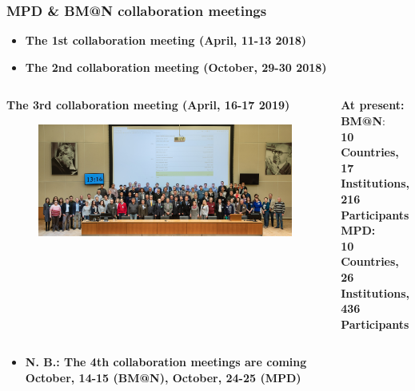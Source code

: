 \documentclass[dvipsnames] {beamer}
\begin{document}
\begin{frame}
  \frametitle{\bf \centering \footnotesize MPD \& BM@N collaboration meetings}
  
  \begin{block}{}
    \begin{itemize}
    \item \bf \centering \scriptsize The 1st collaboration meeting {\color{red} (April, 11-13 2018)}
    \item \bf \centering \scriptsize The 2nd collaboration meeting {\color{red} (October, 29-30 2018)}
    \end{itemize}
   \end{block}
  \begin{columns}[c]   
     \begin{block}{\bf \centering \scriptsize The 3rd collaboration meeting {\color{red} (April, 16-17 2019)}}
       \begin{figure}[H]
         \includegraphics[width=1.\linewidth]{third_collab.jpg}
       \end{figure}
     \end{block}
     
     {\footnotesize 
  \begin{block}{\bf \centering At present:}
    {\bf \color{red} BM@N}: \\ \bf	10 Countries, \\ 17 Institutions, \\ 216 Participants \\    
    {\bf \color{blue} MPD}: \\ \bf	10 Countries, \\ 26 Institutions, \\ 436 Participants   
  \end{block}
  }

  \end{columns}
  
  \begin{block}{}
    \begin{itemize}
      \item \bf \centering N. B.: The 4th collaboration meetings are coming \\ {\color{red} October, 14-15 (BM@N), October, 24-25 (MPD)}
    \end{itemize}
  \end{block}
\end{frame}
\end{document}
